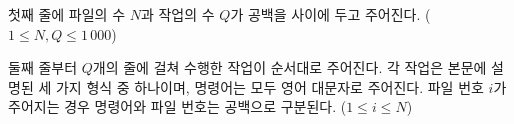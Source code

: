 첫째 줄에 파일의 수 $N$과 작업의 수 $Q$가 공백을 사이에 두고 주어진다. ($1 \le N,Q \le 1\,000$)

둘째 줄부터 $Q$개의 줄에 걸쳐 수행한 작업이 순서대로 주어진다. 각 작업은 본문에 설명된 세 가지 형식 중 하나이며, 명령어는 모두 영어 대문자로 주어진다. 파일 번호 $i$가 주어지는 경우 명령어와 파일 번호는 공백으로 구분된다. ($1 \le i \le N$)